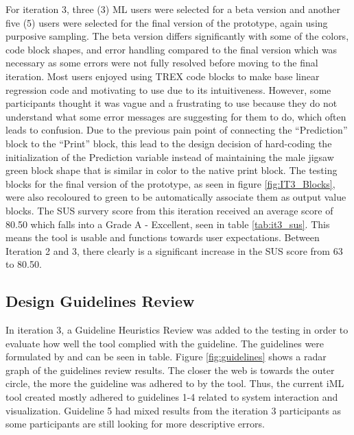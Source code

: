 \documentclass{sigchi-ext}
\begin{document}
For iteration 3, three (3) ML users were selected for a beta version and another five (5) users were selected for the final version of the prototype, again using purposive sampling. The beta version differs significantly with some of the colors, code block shapes, and error handling compared to the final version which was necessary as some errors were not fully resolved before moving to the final iteration. Most users enjoyed using TREX code blocks to make base linear regression code and motivating to use due to its intuitiveness. However, some participants thought it was vague and a  frustrating to use because they do not understand what some error messages are suggesting for them to do, which often leads to confusion. Due to the previous pain point of connecting the ``Prediction'' block to the ``Print'' block, this lead to the design decision of hard-coding the initialization of the Prediction variable instead of maintaining the male jigsaw green block shape that is similar in color to the native print block. The testing blocks for the final version of the prototype, as seen in figure \ref{fig:IT3_Blocks}, were also recoloured to green to be automatically associate them as output value blocks. The SUS survery score from this iteration received an average score of 80.50 which falls into a Grade A - Excellent, seen in table \ref{tab:it3_sus}. This means the tool is usable and functions towards user expectations. Between Iteration 2 and 3, there clearly is a significant increase in the SUS score from 63 to 80.50.

\subsection{Design Guidelines Review}
In iteration 3, a Guideline Heuristics Review was added to the testing in order to evaluate how well the tool complied with the guideline. The guidelines were formulated by \cite{nodalo2019building} and can be seen in table.  Figure \ref{fig:guidelines} shows a radar graph of the guidelines review results. The closer the web is towards the outer circle, the more the guideline was adhered to by the tool. Thus, the current iML tool created mostly adhered to guidelines 1-4 related to system interaction and visualization. Guideline 5 had mixed results from the iteration 3 participants as some participants are still looking for more descriptive errors. 

\end{document}
